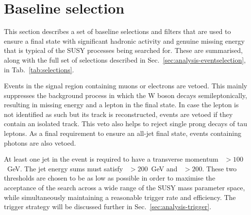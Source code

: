 


\section{Baseline selection}
\label{sec:analysis-baselineselections}

This section describes a set of baseline selections and filters that are used 
to ensure a final state with significant hadronic activity and genuine missing 
energy that is typical of the SUSY %
processes being searched for. These 
are summarised, along with the full set of selections described in 
Sec.~\ref{sec:analysis-eventselection}, in Tab.~\ref{tab:selections}.

Events in the signal region containing muons or electrons are vetoed. This 
mainly suppresses the 
\wj background process in which the W boson decays semileptonically, 
resulting in missing energy and a lepton in the final state. In case the lepton 
is not identified as such but its track is reconstructed, events are vetoed if 
they contain an isolated track. This veto also helps to reject single prong 
decays of tau leptons. %
As a final requirement to ensure an all-jet final state, events containing 
photons are also vetoed.

At least one jet in the event is required to have a transverse momentum 
{\pt~$>100$~GeV}. The jet energy sums must satisfy {\scalht~$>200$~GeV} and 
{\mht~$>200$}. 
These two thresholds are chosen to be as low as possible in order to maximise 
the acceptance of the search across a wide range of the SUSY mass 
parameter space, while simultaneously maintaining a reasonable trigger rate and 
efficiency. The trigger strategy will be discussed further in 
Sec.~\ref{sec:analysis-trigger}.

